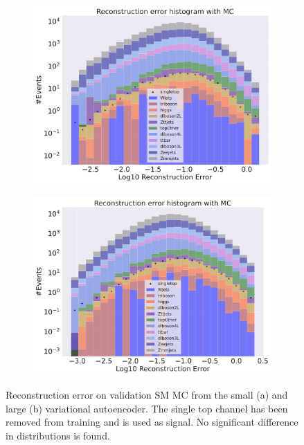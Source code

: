 \begin{figure}[!htb]
    \centering
    \begin{subfigure}{.45\textwidth}
        \includegraphics[width=\textwidth]{Figures/VAE_testing/small/b_data_recon_big_rm3_feats_sig_singletop.pdf}
        \caption{ }
        \label{fig:vae_small_singletop}
    \end{subfigure}
    \hfill
    \begin{subfigure}{.45\textwidth}
        \includegraphics[width=\textwidth]{Figures/VAE_testing/big/b_data_recon_big_rm3_feats_sig_singletop.pdf}
        \caption{ }
        \label{fig:vae_big_singletop}
    \end{subfigure}
    \hfill 
    \caption[VAE | Reconstruction error using Singletop channel as signal]{Reconstruction error on validation SM MC from the small (a) and large (b) variational autoencoder. The single top channel has been removed from training and 
    is used as signal. No significant difference in distributions is found. }
    \label{fig:vae_big_channel_2}
\end{figure}

